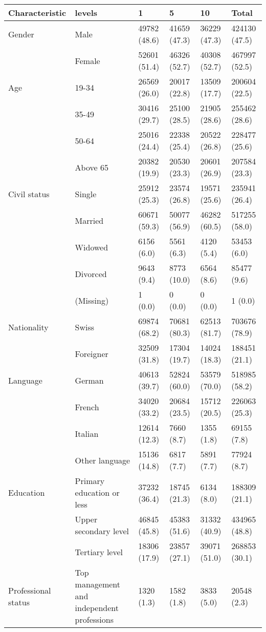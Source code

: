 
\begin{tabular}{llllll}
\toprule
Characteristic & levels & 1 & 5 & 10 & Total\\
\midrule
Gender & Male & 49782 (48.6) & 41659 (47.3) & 36229 (47.3) & 424130 (47.5)\\
 & Female & 52601 (51.4) & 46326 (52.7) & 40308 (52.7) & 467997 (52.5)\\
\addlinespace
Age & 19-34 & 26569 (26.0) & 20017 (22.8) & 13509 (17.7) & 200604 (22.5)\\
 & 35-49 & 30416 (29.7) & 25100 (28.5) & 21905 (28.6) & 255462 (28.6)\\
 & 50-64 & 25016 (24.4) & 22338 (25.4) & 20522 (26.8) & 228477 (25.6)\\
 & Above 65 & 20382 (19.9) & 20530 (23.3) & 20601 (26.9) & 207584 (23.3)\\
\addlinespace
Civil status & Single & 25912 (25.3) & 23574 (26.8) & 19571 (25.6) & 235941 (26.4)\\
 & Married & 60671 (59.3) & 50077 (56.9) & 46282 (60.5) & 517255 (58.0)\\
 & Widowed & 6156 (6.0) & 5561 (6.3) & 4120 (5.4) & 53453 (6.0)\\
 & Divorced & 9643 (9.4) & 8773 (10.0) & 6564 (8.6) & 85477 (9.6)\\
 & (Missing) & 1 (0.0) & 0 (0.0) & 0 (0.0) & 1 (0.0)\\
\addlinespace
Nationality & Swiss & 69874 (68.2) & 70681 (80.3) & 62513 (81.7) & 703676 (78.9)\\
 & Foreigner & 32509 (31.8) & 17304 (19.7) & 14024 (18.3) & 188451 (21.1)\\
\addlinespace
Language & German & 40613 (39.7) & 52824 (60.0) & 53579 (70.0) & 518985 (58.2)\\
 & French & 34020 (33.2) & 20684 (23.5) & 15712 (20.5) & 226063 (25.3)\\
 & Italian & 12614 (12.3) & 7660 (8.7) & 1355 (1.8) & 69155 (7.8)\\
 & Other language & 15136 (14.8) & 6817 (7.7) & 5891 (7.7) & 77924 (8.7)\\
\addlinespace
Education & Primary education or less & 37232 (36.4) & 18745 (21.3) & 6134 (8.0) & 188309 (21.1)\\
 & Upper secondary level & 46845 (45.8) & 45383 (51.6) & 31332 (40.9) & 434965 (48.8)\\
 & Tertiary level & 18306 (17.9) & 23857 (27.1) & 39071 (51.0) & 268853 (30.1)\\
\addlinespace
Professional status & Top management and independent professions & 1320 (1.3) & 1582 (1.8) & 3833 (5.0) & 20548 (2.3)\\

\end{tabular}
